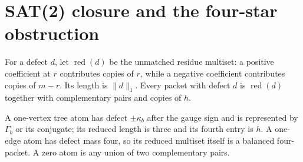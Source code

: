 \documentclass[11pt,oneside]{book}
\theoremstyle{definition}
\theoremstyle{remark}
\begin{document}
\section{SAT(2) closure and the four-star obstruction}
For a defect \(d\), let \(\operatorname{red}(d)\) be the unmatched residue multiset: a positive coefficient at \(r\) contributes copies of \(r\), while a negative coefficient contributes copies of \(m-r\). Its length is \(\|d\|_1\). Every packet with defect \(d\) is \(\operatorname{red}(d)\) together with complementary pairs and copies of \(h\).

A one-vertex tree atom has defect \(\pm\kappa_b\) after the gauge sign and is represented by \(\Gamma_b\) or its conjugate; its reduced length is three and its fourth entry is \(h\). A one-edge atom has defect mass four, so its reduced multiset itself is a balanced four-packet. A zero atom is any union of two complementary pairs.
\end{document}
